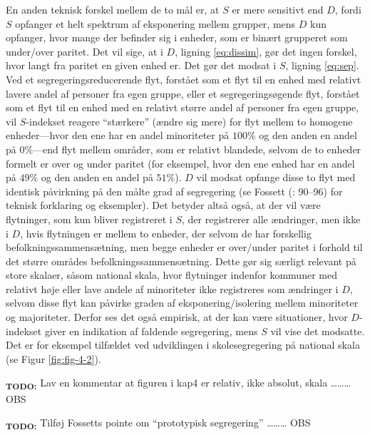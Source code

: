 \documentclass[
]{book}
\begin{document}
En anden teknisk forskel mellem de to mål er, at \(S\) er mere sensitivt end \(D\), fordi \(S\) opfanger et helt spektrum af eksponering mellem grupper, mens \(D\) kun opfanger, hvor mange der befinder sig i enheder, som er binært grupperet som under/over paritet. Det vil sige, at i \(D\), ligning \eqref{eq:dissim}, gør det ingen forskel, hvor langt fra paritet en given enhed er. Det gør det modsat i \(S\), ligning \eqref{eq:sep}. Ved et segregeringsreducerende flyt, forstået som et flyt til en enhed med relativt lavere andel af personer fra egen gruppe, eller et segregeringsøgende flyt, forstået som et flyt til en enhed med en relativt større andel af personer fra egen gruppe, vil \(S\)-indekset reagere ``stærkere'' (ændre sig mere) for flyt mellem to homogene enheder---hvor den ene har en andel minoriteter på \(100\%\) og den anden en andel på \(0\%\)---end flyt mellem områder, som er relativt blandede, selvom de to enheder formelt er over og under paritet (for eksempel, hvor den ene enhed har en andel på \(49\%\) og den anden en andel på \(51\%\)). \(D\) vil modsat opfange disse to flyt med identisk påvirkning på den målte grad af segregering (se Fossett (: 90--96) for teknisk forklaring og eksempler). Det betyder altså også, at der vil være flytninger, som kun bliver registreret i \(S\), der registrerer alle ændringer, men ikke i \(D\), hvis flytningen er mellem to enheder, der selvom de har forskellig befolkningssammensætning, men begge enheder er over/under paritet i forhold til det større områdes befolkningssammensætning. Dette gør sig særligt relevant på store skalaer, såsom national skala, hvor flytninger indenfor kommuner med relativt høje eller lave andele af minoriteter ikke registreres som ændringer i \(D\), selvom disse flyt kan påvirke graden af eksponering/isolering mellem minoriteter og majoriteter. Derfor ses det også empirisk, at der kan være situationer, hvor \(D\)-indekset giver en indikation af faldende segregering, mens \(S\) vil vise det modsatte. Det er for eksempel tilfældet ved udviklingen i skolesegregering på national skala (se Figur \ref{fig:fig-4-2}).

\textsubscript{\textbf{TODO:}} Lav en kommentar at figuren i kap4 er relativ, ikke absolut, skala \ldots\ldots\ldots{} OBS

\textsubscript{\textbf{TODO:}} Tilføj Fossetts pointe om ``prototypisk segregering'' \ldots\ldots\ldots{} OBS
\end{document}
